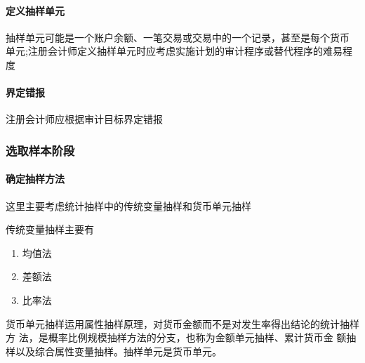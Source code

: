 \documentclass[UTF8,12pt]{ctexart}
\numberwithin{equation}{section} %
\numberwithin{figure}{section}
\numberwithin{table}{section}
\begin{document}
	\paragraph{定义抽样单元}
	抽样单元可能是一个账户余额、一笔交易或交易中的一个记录，甚至是每个货币 单元;注册会计师定义抽样单元时应考虑实施计划的审计程序或替代程序的难易程度
	
	\paragraph{界定错报}
	注册会计师应根据审计目标界定错报
	
	\subsubsection{选取样本阶段}
	\paragraph{确定抽样方法}
	这里主要考虑统计抽样中的传统变量抽样和货币单元抽样
	
	传统变量抽样主要有
	\begin{enumerate}
		\item 均值法
		
		\item 差额法
		
		\item 比率法
	\end{enumerate}
	
	货币单元抽样运用属性抽样原理，对货币金额而不是对发生率得出结论的统计抽样方 法，是概率比例规模抽样方法的分支，也称为金额单元抽样、累计货币金 额抽样以及综合属性变量抽样。抽样单元是货币单元。
	
\end{document}
